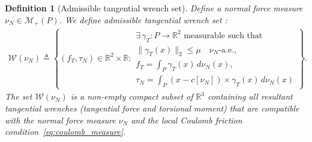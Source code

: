 \documentclass[11pt,a4paper]{article}
\theoremstyle{plain}
\newtheorem{definition}[theorem]{Definition}
\newcommand{\R}{\mathbb{R}}
\begin{document}
\begin{definition}[Admissible tangential wrench set]
    Define a normal force measure $\nu_N\in\mathcal M_+(P)$. We define \textit{admissible tangential wrench set} :
    \begin{align}
    \mathcal W(\nu_N)
    \triangleq
    \left\{
    (f_T,\tau_N)\in\mathbb R^2\times\mathbb R:
    \begin{array}{l}
    \exists\,\gamma_T:P\rightarrow\mathbb R^2
    \text{ measurable such that}\\
    \|\gamma_T(x)\|_2\le\mu
    \quad\nu_N\text{-a.e.},\\
    f_T=\displaystyle\int_P\gamma_T(x)\,d\nu_N(x),\\
    \tau_N=\displaystyle\int_P
    (x-c[\nu_N])\times\gamma_T(x)\,d\nu_N(x)
    \end{array}
    \right\}.
    \end{align}
    The set $\mathcal W(\nu_N)$ is a non-empty compact subset of $\R^3$ containing all resultant tangential wrenches (tangential force and torsional moment) that are compatible with the normal force measure $\nu_N$ and the local Coulomb friction condition~\eqref{eq:coulomb_measure}.
\end{definition}
\end{document}
